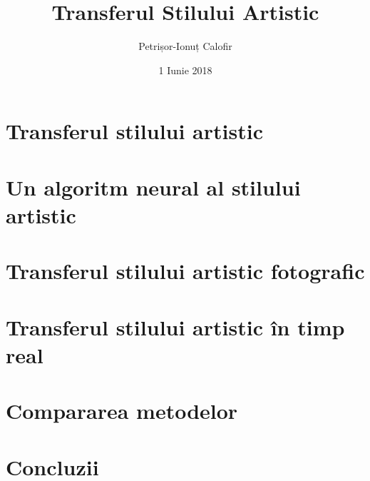 \documentclass[
	12pt, %
	twoside %
]{report}
\title{Transferul Stilului Artistic}
\author{Petrișor-Ionuț Calofir}
\date{1 Iunie 2018}
\begin{document}



\tableofcontents\thispagestyle{fancy}

\chapter{Transferul stilului artistic}\thispagestyle{fancy}


\chapter{Un algoritm neural al stilului artistic}\thispagestyle{fancy}
\label{anaoas}


\chapter{Transferul stilului artistic fotografic}\thispagestyle{fancy}
\label{dpst}


\chapter{Transferul stilului artistic în timp real}\thispagestyle{fancy}
\label{plfrtst}


\chapter{Compararea metodelor}\thispagestyle{fancy}


\chapter{Concluzii}\thispagestyle{fancy}


\printbibliography[title=Bibliografie]\thispagestyle{fancy}
\end{document}
